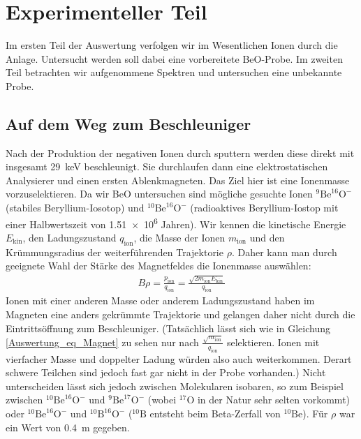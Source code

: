 \section{Experimenteller Teil}
Im ersten Teil der Auswertung verfolgen wir im Wesentlichen Ionen durch die Anlage.
Untersucht werden soll dabei eine vorbereitete BeO-Probe.
Im zweiten Teil betrachten wir aufgenommene Spektren und untersuchen eine unbekannte Probe.

\subsection{Auf dem Weg zum Beschleuniger}
Nach der Produktion der negativen Ionen durch sputtern werden diese direkt mit insgesamt \SI{29}{\kilo\electronvolt} beschleunigt.
Sie durchlaufen dann eine elektrostatischen Analysierer und einen ersten Ablenkmagneten.
Das Ziel hier ist eine Ionenmasse vorzuselektieren.
Da wir BeO untersuchen sind mögliche gesuchte Ionen $^{9}\text{Be}^{16}\text{O}^{-}$ (stabiles Beryllium-Iosotop) und $^{10}\text{Be}^{16}\text{O}^{-}$ (radioaktives Beryllium-Iostop mit einer Halbwertszeit von \num{1.51e6} Jahren).
Wir kennen die kinetische Energie $E_{\text{kin}}$, den Ladungszustand $q_{\text{ion}}$, die Masse der Ionen $m_{\text{ion}}$ und den Krümmungsradius der weiterführenden Trajektorie $\rho$.
Daher kann man durch geeignete Wahl der Stärke des Magnetfeldes die Ionenmasse auswählen:
\begin{gather}
    B \rho = \frac{p_{\text{ion}}}{q_{\text{ion}}} = \frac{\sqrt{2m_{\text{ion}}E_{\text{kin}}}}{q_{\text{ion}}}
    \label{Auswertung_eq_Magnet}
\end{gather}
Ionen mit einer anderen Masse oder anderem Ladungszustand haben im Magneten eine anders gekrümmte Trajektorie und gelangen daher nicht durch die Eintrittsöffnung zum Beschleuniger.
(Tatsächlich lässt sich wie in Gleichung \ref{Auswertung_eq_Magnet} zu sehen nur nach $\frac{\sqrt{m_{\text{ion}}}}{q_{\text{ion}}}$ selektieren.
Ionen mit vierfacher Masse und doppelter Ladung würden also auch weiterkommen. Derart schwere Teilchen sind jedoch fast gar nicht in der Probe vorhanden.)
Nicht unterscheiden lässt sich jedoch zwischen Molekularen isobaren, so zum Beispiel zwischen $^{10}\text{Be}^{16}\text{O}^{-}$ und $^{9}\text{Be}^{17}\text{O}^{-}$ (wobei $^{17}\text{O}$ in der Natur sehr selten vorkommt) oder $^{10}\text{Be}^{16}\text{O}^{-}$ und $^{10}\text{B}^{16}\text{O}^{-}$ ($^{10}\text{B}$ entsteht beim Beta-Zerfall von $^{10}\text{Be}$).
Für $\rho$ war ein Wert von \SI{0.4}{\metre} gegeben.
